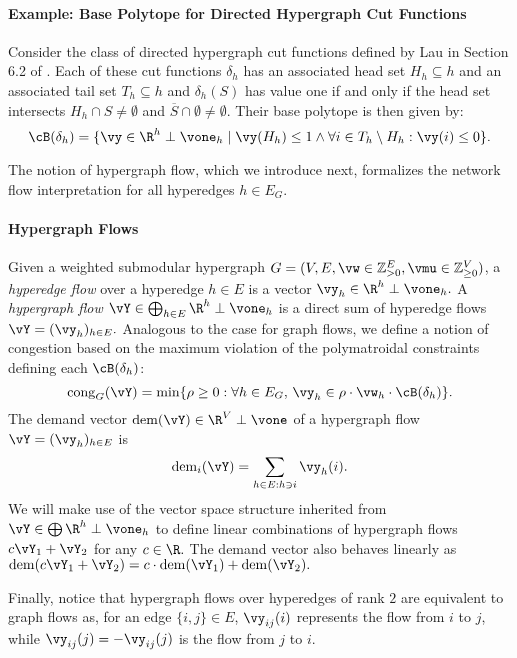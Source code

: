 \documentclass[letterpaper]{article}
\newcommand{\dem}{\operatorname{dem}}
\renewcommand{\cong}{\operatorname{cong}}
\begin{document}
\paragraph{Example: Base Polytope for Directed Hypergraph Cut Functions} Consider the class of directed hypergraph cut functions defined by Lau \etal in Section 6.2 of \cite{lau2023fast}. Each of these cut functions $\delta_h$ has an associated head set $H_h \subseteq h$ and an associated tail set $T_h \subseteq h$ and $\delta_h(S)$ has value one if and only if the head set intersects $H_h\cap S\neq \emptyset$ and $\overline{S}\cap \emptyset \neq \emptyset$. Their base polytope is then given by:
\[
    \cB(\delta_h) = \{\vy \in \R^h \perp \vone_h \mid \vy(H_h)\leq 1 \land \forall i\in T_h \setminus H_h : \vy(i)\leq 0\}.
\]

\noindent
The notion of hypergraph flow, which we introduce next, formalizes the network flow interpretation for all hyperedges $h \in E_G.$

\paragraph{Hypergraph Flows}
Given a weighted submodular hypergraph $G=(V,E, \vw \in \mathbb{Z}^E_{>0},  \vmu \in \mathbb{Z}^V_{\geq 0})$, a {\it hyperedge flow} over a hyperedge $h \in E$ is a vector $\vy_h \in \R^h \perp \vone_h.$ A {\it hypergraph flow} $\vY \in \bigoplus_{h\in E} \R^h \perp \vone_h$ is a direct sum of hyperedge flows $\vY = (\vy_h)_{h \in E}.$
Analogous to the case for graph flows, we define a notion of congestion based on the maximum violation of the polymatroidal constraints defining each $\cB(\delta_h)$:
\begin{equation}
\label{eq.congestion}
\cong_G(\vY) = \min \{ \rho \geq 0 : \forall h \in E_G,\, \vy_h \in \rho \cdot \vw_h \cdot \cB(\delta_h)\}.
\end{equation}
The demand vector $\dem(\vY) \in \R^V \perp \vone$ of a hypergraph flow $\vY = (\vy_h)_{h \in E}$ is
\begin{equation}
\label{eq.demand}
\dem_i(\vY) = \sum_{ h \in E: h \ni i} \vy_h(i).
\end{equation}
We will make use of the vector space structure inherited from $\vY \in \bigoplus \R^h \perp \vone_h$ to define linear combinations of hypergraph flows $c\vY_1 + \vY_2$ for any $c \in \R.$ The demand vector also behaves linearly as $\dem(c\vY_1+\vY_2) = c \cdot \dem(\vY_1) + \dem(\vY_2).$

Finally, notice that hypergraph flows over hyperedges of rank $2$ are equivalent to graph flows as, for an edge $\{i,j\} \in E$, $\vy_{ij}(i)$ represents the flow from $i$ to $j$, while $\vy_{ij}(j) = -\vy_{ij}(j)$ is the flow from $j$ to $i$.
\end{document}

